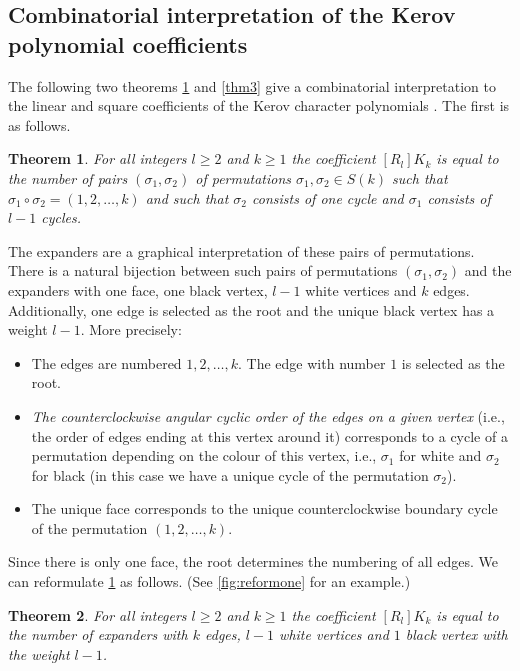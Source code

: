 \documentclass[submission]{FPSAC2021}
\newtheorem{theorem}{Theorem}
\begin{document}
\subsection{Combinatorial interpretation of 
the Kerov polynomial coefficients}
The following two theorems 
\cref{thm1} and \cref{thm3}
give a combinatorial interpretation to 
the linear and square coefficients of 
the Kerov character polynomials 
\cite[Theorem 1.2, Theorem 1.3]{DFS10}.
The first is as follows.
\begin{theorem}
\label{thm1} 
For all integers $l\geq2$ and $k\geq 1$ 
the coefficient $[R_l] K_k$ 
is equal to the number of pairs 
$(\sigma_1,\sigma_2)$ of permutations 
$\sigma_1, \sigma_2 \in S(k)$ such that
$\sigma_1\circ\sigma_2=(1,2,\ldots,k)$ and 
such that $\sigma_2$ consists of one
cycle and $\sigma_1$ consists of $l-1$ cycles.
\end{theorem}
The expanders are a graphical interpretation 
of these pairs of permutations.
There is a natural bijection between such 
pairs of permutations $(\sigma_1,
\sigma_2)$ and the expanders with one face, 
one black vertex, $l-1$ white
vertices and $k$ edges. Additionally, one edge 
is selected as the root and the unique black 
vertex has a weight $l-1$. More precisely:

\begin{itemize}

\item The edges are numbered $1, 2, \dots, k$.
The edge with number $1$ is selected as the root.

\item \emph{The counterclockwise angular cyclic order of the 
edges on a given vertex} (i.e., the order of edges 
ending at this vertex around it) corresponds to 
a cycle of a permutation
depending on the colour of this vertex, i.e., 
$\sigma_1$ for white and $\sigma_2$ for black
(in this case we have a unique cycle of 
the permutation $\sigma_2$). 

\item The unique face corresponds to the unique 
counterclockwise boundary
cycle of the permutation $(1, 2, \ldots, k)$.

\end{itemize}
Since there is only one face, the root determines the 
numbering of all edges. We can reformulate \cref{thm1} as follows. 
(See \cref{fig:reformone} for an example.)
\begin{theorem}
\label{thm2}
For all integers $l\geq2$ and $k\geq 1$ the 
coefficient $[R_l] K_k$ is equal to the number 
of expanders with $k$ edges, $l-1$ white vertices 
and $1$ black vertex with the weight $l-1$.
\end{theorem}
\end{document}
